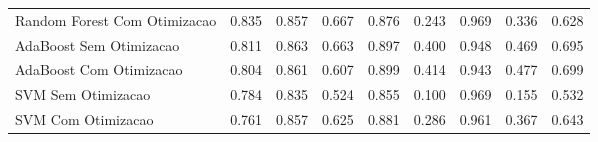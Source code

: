 \begin{table}[H]
\begin{adjustwidth}{ -1in }{ -1in }
\begin{tabular}{lrrrrrrrr}
      Random Forest Com Otimizacao &                        0.835 &                         0.857 &                            0.667 &                            0.876 &                          0.243 &                          0.969 &                                     0.336 &                                 0.628 \\
           AdaBoost Sem Otimizacao &                        0.811 &                         0.863 &                            0.663 &                            0.897 &                          0.400 &                          0.948 &                                     0.469 &                                 0.695 \\
           AdaBoost Com Otimizacao &                        0.804 &                         0.861 &                            0.607 &                            0.899 &                          0.414 &                          0.943 &                                     0.477 &                                 0.699 \\
                SVM Sem Otimizacao &                        0.784 &                         0.835 &                            0.524 &                            0.855 &                          0.100 &                          0.969 &                                     0.155 &                                 0.532 \\
                SVM Com Otimizacao &                        0.761 &                         0.857 &                            0.625 &                            0.881 &                          0.286 &                          0.961 &                                     0.367 &                                 0.643 \\
\bottomrule
\end{tabular}
    \end{adjustwidth}
    \renewcommand{\arraystretch}{1.0} %
\end{table}
